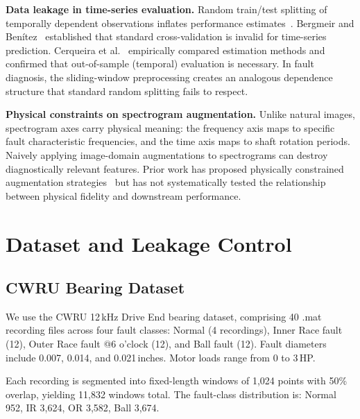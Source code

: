﻿\documentclass[11pt,a4paper]{article}
\begin{document}
\textbf{Data leakage in time-series evaluation.} Random train/test splitting of temporally dependent observations inflates performance estimates~\cite{bergmeir2012use}. Bergmeir and Ben\'{i}tez~\cite{bergmeir2012use} established that standard cross-validation is invalid for time-series prediction. Cerqueira et al.~\cite{cerqueira2020evaluating} empirically compared estimation methods and confirmed that out-of-sample (temporal) evaluation is necessary. In fault diagnosis, the sliding-window preprocessing creates an analogous dependence structure that standard random splitting fails to respect.

\textbf{Physical constraints on spectrogram augmentation.} Unlike natural images, spectrogram axes carry physical meaning: the frequency axis maps to specific fault characteristic frequencies, and the time axis maps to shaft rotation periods. Naively applying image-domain augmentations to spectrograms can destroy diagnostically relevant features. Prior work has proposed physically constrained augmentation strategies~\cite{shao2019highly,li2020diagnosing} but has not systematically tested the relationship between physical fidelity and downstream performance.

\section{Dataset and Leakage Control}

\subsection{CWRU Bearing Dataset}

We use the CWRU 12\,kHz Drive End bearing dataset, comprising 40 .mat recording files across four fault classes: Normal (4 recordings), Inner Race fault (12), Outer Race fault @6 o'clock (12), and Ball fault (12). Fault diameters include 0.007, 0.014, and 0.021\,inches. Motor loads range from 0 to 3\,HP.

Each recording is segmented into fixed-length windows of 1,024 points with 50\% overlap, yielding 11,832 windows total. The fault-class distribution is: Normal 952, IR 3,624, OR 3,582, Ball 3,674.
\end{document}
